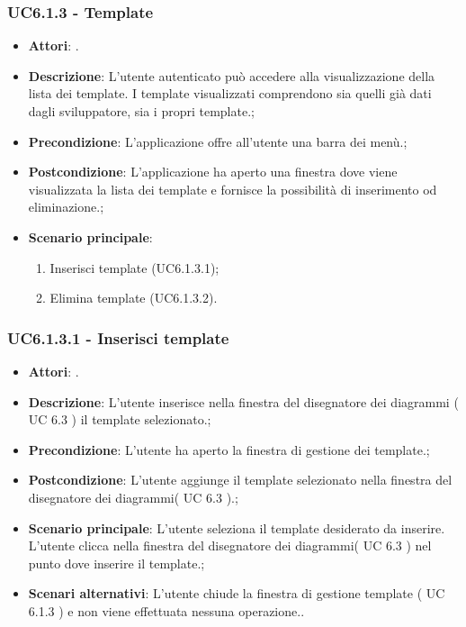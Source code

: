 \subsubsection{UC6.1.3 - Template} 
\label{sssec:UC6.1.3} 
\begin{itemize} 
\item \textbf{Attori}: .
\item \textbf{Descrizione}: L’utente autenticato può accedere alla visualizzazione della lista dei template. I template visualizzati comprendono sia quelli già dati dagli sviluppatore, sia i propri template.;
\item \textbf{Precondizione}: L’applicazione offre all’utente una barra dei menù.;
\item \textbf{Postcondizione}: L'applicazione ha aperto una finestra dove viene visualizzata la lista dei template e fornisce la possibilità di inserimento od eliminazione.;
\item \textbf{Scenario principale}: \begin{enumerate}\item Inserisci template (UC6.1.3.1);\item Elimina template (UC6.1.3.2). 
 \end{enumerate}
\end{itemize} 
\subsubsection{UC6.1.3.1 - Inserisci template} 
\label{sssec:UC6.1.3.1} 
\begin{itemize} 
\item \textbf{Attori}: .
\item \textbf{Descrizione}: L'utente inserisce nella finestra del disegnatore dei diagrammi ( UC 6.3 ) il template selezionato.;
\item \textbf{Precondizione}: L'utente ha aperto la finestra di gestione dei template.;
\item \textbf{Postcondizione}: L'utente aggiunge il template selezionato nella finestra del disegnatore dei diagrammi( UC 6.3 ).;
\item \textbf{Scenario principale}: L'utente seleziona il template desiderato da inserire.
L'utente clicca nella finestra del disegnatore dei diagrammi( UC 6.3 ) nel punto dove inserire il template.;\item \textbf{Scenari alternativi}: L'utente chiude la finestra di gestione template ( UC 6.1.3 ) e non viene effettuata nessuna operazione..
\end{itemize} 
